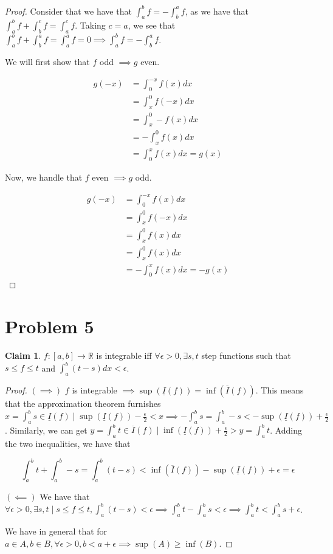 \documentclass[12pt,letterpaper]{article}
\theoremstyle{definition}
\newtheorem*{claim}{Claim}
\newcommand{\R}{\mathbb{R}}
\begin{document}
\begin{proof}
  Consider that we have that $\int_a^bf = -\int_b^a f$, as we have that
  $\int_a^b f + \int_b^c f = \int_a^c f$. Taking $c =a$, we see that $\int_a^bf
  + \int_b^a f = \int_a^a f = 0 \implies \int_a^b f = -\int_b^a f$.

  We will first show that $f$ odd $\implies g$ even.

  \begin{align*}
    g(-x) &= \int_0^{-x}f(x)dx \\
          &= \int_x^0 f(-x)dx \\
          &= \int_x^0 -f(x)dx \\
          &= -\int_x^0 f(x)dx \\
          &= \int_0^x f(x)dx = g(x)
  \end{align*}

  Now, we handle that $f$ even $\implies g$ odd.

  \begin{align*}
    g(-x) &= \int_0^{-x}f(x)dx \\
          &= \int_x^0 f(-x)dx \\
          &= \int_x^0 f(x)dx \\
          &= \int_x^0 f(x)dx \\
          &= -\int_0^x f(x)dx = -g(x)
  \end{align*}
\end{proof}

\section*{Problem 5}

\begin{claim}
  $f: [a,b] \rightarrow \R$ is integrable iff $\forall \epsilon > 0, \exists
  s,t$ step functions such that $s \leq f \leq t$ and $\int_a^b(t - s)dx < \epsilon$.
\end{claim}

\begin{proof}
  $(\implies)$ $f$ is integrable $\implies \sup(\underline{I}(f)) =
  \inf(\overline{I}(f))$. This means that the approximation theorem furnishes $x =
  \int_a^b s \in \underline{I}(f) \mid \sup(\underline{I}(f)) -
  \frac{\epsilon}{2} < x \implies -\int_a^bs = \int_a^b-s < -\sup(\underline{I}(f)) +
  \frac{\epsilon}{2}$. Similarly, we can get $y = \int_a^b t \in
  \overline{I}(f) \mid \inf(\underline{I}(f)) + \frac{\epsilon}{2} > y =
  \int_a^b t$. Adding the two inequalities, we have that

  \[
    \int_a^b t + \int_a^b-s = \int_a^b (t - s) < \inf(\overline{I}(f)) -
    \sup(\underline{I}(f)) + \epsilon = \epsilon
  \]

  $(\impliedby)$
  We have that $\forall \epsilon > 0, \exists s,t \mid s \leq f \leq t,
  \int_a^b(t-s) < \epsilon \implies \int_a^b t - \int_a^bs < \epsilon \implies
  \int_a^bt < \int_a^bs + \epsilon$.

  We have in general that for $a \in A, b \in B, \forall \epsilon > 0, b < a +
  \epsilon \implies \sup(A) \geq \inf(B)$.
\end{proof}
\end{document}
